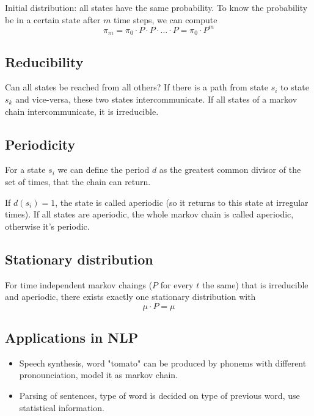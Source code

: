\documentclass[11pt]{article}
\begin{document}
Initial distribution: all states have the same probability. To know the probability be in a certain 
state after $m$ time steps, we can compute
\begin{equation}
	\pi_m = \pi_0 \cdot P \cdot P \cdot \ldots \cdot P = \pi_0 \cdot P^m
\end{equation}

\subsection{Reducibility}
Can all states be reached from all others? If there is a path from state $s_i$ to 
state $s_k$ and vice-versa, these two
states intercommunicate. If all states of a markov chain intercommunicate, it is irreducible. 

\subsection{Periodicity}
For a state $s_i$ we can define the period $d$ as the greatest common divisor of the set of times, that the
chain can return. 

If $d(s_i) = 1$, the state is called aperiodic (so it returns to this state at irregular times).
 If all states are aperiodic, the whole markov chain
is called aperiodic, otherwise it's periodic.

\subsection{Stationary distribution}
For time independent markov chaings ($P$ for every $t$ the same) that is irreducible and aperiodic, there
exists exactly one stationary distribution with 
\begin{equation}
	\mu \cdot P = \mu
\end{equation}
\subsection{Applications in NLP}
\begin{itemize}
	\item Speech synthesis, word "tomato" can be produced by phonems with different pronounciation,
model it as markov chain.
	\item Parsing of sentences, type of word is decided on type of previous word, use statistical information.
\end{itemize} 
\end{document}
